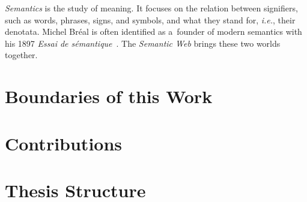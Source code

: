 \emph{Semantics} is the study of meaning.
It focuses on the relation between signifiers, such as words, phrases, signs, and symbols,
and what they stand for, \emph{i.e.}, their denotata.
Michel Bréal is often identified as a~founder of modern semantics with his 1897
\emph{Essai de sémantique}~\cite{Breal1897}.
The \emph{Semantic Web} brings these two worlds together.

\section{Boundaries of this Work}

\section{Contributions}

\section{Thesis Structure}